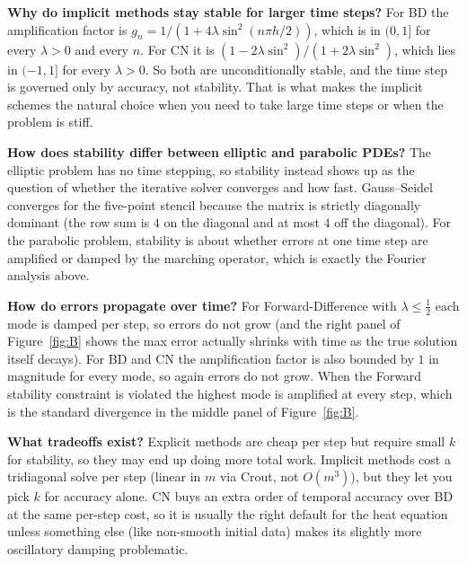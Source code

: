 \documentclass[11pt]{article}
\begin{document}
\textbf{Why do implicit methods stay stable for larger time steps?} For BD
the amplification factor is $g_{n} = 1/(1 + 4\lambda\sin^{2}(n\pi h/2))$,
which is in $(0, 1]$ for every $\lambda > 0$ and every $n$. For CN it is
$(1 - 2\lambda \sin^{2})/(1 + 2\lambda \sin^{2})$, which lies in $(-1, 1]$
for every $\lambda > 0$. So both are unconditionally stable, and the time
step is governed only by accuracy, not stability. That is what makes the
implicit schemes the natural choice when you need to take large time steps
or when the problem is stiff.

\textbf{How does stability differ between elliptic and parabolic PDEs?} The
elliptic problem has no time stepping, so stability instead shows up as the
question of whether the iterative solver converges and how fast.
Gauss--Seidel converges for the five-point stencil because the matrix is
strictly diagonally dominant (the row sum is $4$ on the diagonal and at most
$4$ off the diagonal). For the parabolic problem, stability is about whether
errors at one time step are amplified or damped by the marching operator,
which is exactly the Fourier analysis above.

\textbf{How do errors propagate over time?} For Forward-Difference with
$\lambda \le \tfrac12$ each mode is damped per step, so errors do not grow
(and the right panel of Figure~\ref{fig:B} shows the max error actually
shrinks with time as the true solution itself decays). For BD and CN the
amplification factor is also bounded by $1$ in magnitude for every mode, so
again errors do not grow. When the Forward stability constraint is violated
the highest mode is amplified at every step, which is the standard
divergence in the middle panel of Figure~\ref{fig:B}.

\textbf{What tradeoffs exist?} Explicit methods are cheap per step but
require small $k$ for stability, so they may end up doing more total work.
Implicit methods cost a tridiagonal solve per step (linear in $m$ via Crout,
not $O(m^{3})$), but they let you pick $k$ for accuracy alone. CN buys an
extra order of temporal accuracy over BD at the same per-step cost, so it is
usually the right default for the heat equation unless something else (like
non-smooth initial data) makes its slightly more oscillatory damping
problematic.
\end{document}
